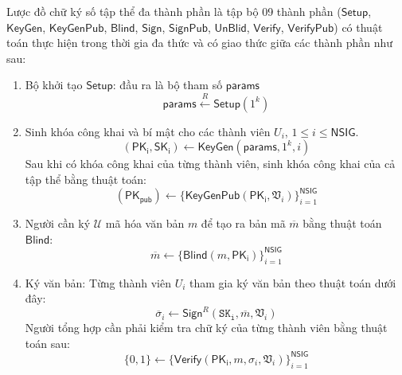 \begin{defi} Lược đồ chữ ký số tập thể đa thành phần là tập bộ 09 thành phần ($\boldsymbol{\mathsf{Setup}}$, $\boldsymbol{\mathsf{KeyGen}}$, $\boldsymbol{\mathsf{KeyGenPub}}$, $\boldsymbol{\mathsf{Blind}}$, $\boldsymbol{\mathsf{Sign}}$, $\boldsymbol{\mathsf{SignPub}}$, $\boldsymbol{\mathsf{UnBlid}}$, $\boldsymbol{\mathsf{Verify}}$, $\boldsymbol{\mathsf{VerifyPub}}$) có thuật toán thực hiện trong thời gia đa thức và có giao thức giữa các thành phần như sau: 
	
	\begin{enumerate}[label=(\arabic*)]
		\item Bộ khởi tạo $\boldsymbol{\mathsf{Setup}}$: đầu ra là bộ tham số $\mathsf{params} $ 
		\begin{equation}
		\mathsf{params} \stackrel{R}{\longleftarrow}  \boldsymbol{\mathsf{Setup}}(1^k)
		\end{equation}
		\item Sinh khóa công khai và bí mật cho các thành viên $U_i$, $1\leqslant i\leqslant \mathsf{NSIG}$.
		\begin{equation}
		\mathsf{(PK_i,SK_i)} \gets \boldsymbol{\mathsf{KeyGen}}(\mathsf{params},1^k, i)
		\end{equation}
		Sau khi có khóa công khai của từng thành viên, sinh khóa công khai của cả tập thể bằng thuật toán:
		\begin{equation}
		\mathsf{(PK_{pub})} \gets \{\boldsymbol{\mathsf{KeyGenPub}}(\mathsf{PK_i},\mathfrak{V}_i)\}^{\mathsf{NSIG}}_{i=1}
		\end{equation}	
		\item Người cần ký $\boldsymbol{\mathcal{U}}$ mã hóa văn bản $m$ để tạo ra bản mã $\overline{m}$ bằng thuật toán $\boldsymbol{\mathsf{Blind}}$:
		\begin{equation}
		\overline{m} \gets \{\boldsymbol{\mathsf{Blind}}(m,\mathsf{PK_i})\}^{\mathsf{NSIG}}_{i=1}
		\end{equation}
		\item Ký văn bản: Từng thành viên $U_i$ tham gia ký văn bản theo thuật toán dưới đây:
		\begin{equation}
		\overline{\sigma}_i \gets \boldsymbol{\mathsf{Sign}}^R(\mathtt{SK_i},\overline{m},\mathfrak{V}_i)
		\end{equation}
		Người tổng hợp cần phải kiểm tra chữ ký của từng thành viên bằng thuật toán sau:
		\begin{equation}
		\{0,1\} \gets \{\boldsymbol{\mathsf{Verify}}(\mathsf{PK_{i}},m,\sigma_{i},\mathfrak{V}_i)\}^{\mathsf{NSIG}}_{i=1}  

\end{equation}
\end{enumerate}
\end{defi}
